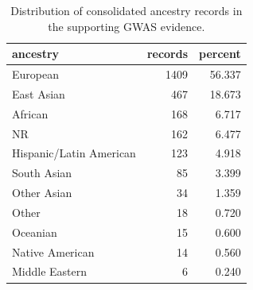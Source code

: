\begin{table}
\caption{Distribution of consolidated ancestry records in the supporting GWAS evidence.}
\label{tab:s1_ancestry_distribution}
\begin{tabular}{lrr}
\toprule
ancestry & records & percent \\
\midrule
European & 1409 & 56.337 \\
East Asian & 467 & 18.673 \\
African & 168 & 6.717 \\
NR & 162 & 6.477 \\
Hispanic/Latin American & 123 & 4.918 \\
South Asian & 85 & 3.399 \\
Other Asian & 34 & 1.359 \\
Other & 18 & 0.720 \\
Oceanian & 15 & 0.600 \\
Native American & 14 & 0.560 \\
Middle Eastern & 6 & 0.240 \\
\bottomrule
\end{tabular}
\end{table}
